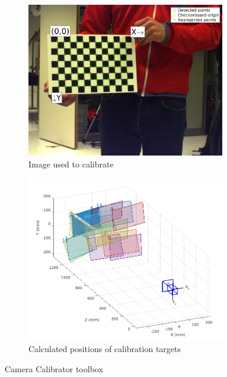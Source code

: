 \documentclass[
a4paper,     %
11pt         %
]{scrartcl}  %
\begin{document}
\begin{figure}[ht!]
\centering
\begin{subfigure}{.5\textwidth}
  \centering
  \includegraphics[width=0.95\textwidth]{calibrator1.png}
  \caption{Image used to calibrate}
  \label{fig:monCal_cal1}
\end{subfigure}%
\begin{subfigure}{.5\textwidth}
  \centering
  \includegraphics[width=0.95\textwidth]{calibrator_ov.png}
  \caption{Calculated positions of calibration targets}
  \label{fig:monCal_cal2}
\end{subfigure}
\caption{Camera Calibrator toolbox}
\label{fig:monCal_cal}
\end{figure}
\end{document}
